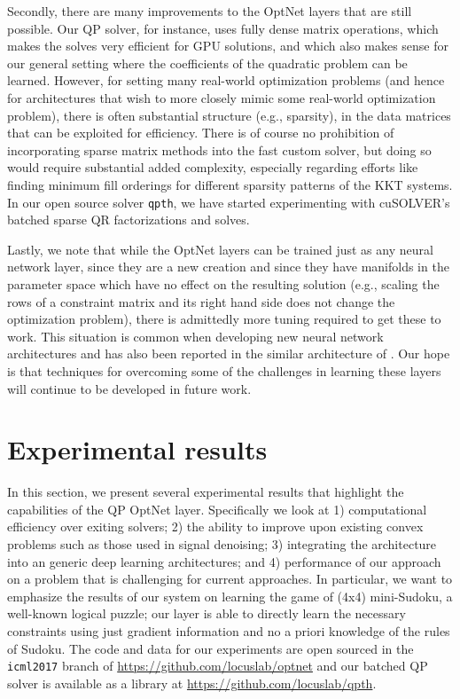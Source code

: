 Secondly, there are many improvements to the OptNet layers that are still
possible.  Our QP solver, for instance, uses fully dense matrix operations,
which makes the solves very efficient for GPU solutions, and which also makes
sense for our general setting where the coefficients of the quadratic problem
can be learned.  However, for setting many real-world optimization problems
(and hence for architectures that wish to more closely mimic some real-world
optimization problem), there is often substantial structure (e.g., sparsity), in
the data matrices that can be exploited for efficiency.
There is of course no prohibition of incorporating sparse matrix methods into
the fast custom solver, but doing so would require substantial added complexity,
especially regarding efforts like finding minimum fill orderings for different
sparsity patterns of the KKT systems.
In our open source solver \verb!qpth!, we have started experimenting
with cuSOLVER's batched sparse QR factorizations and solves.

Lastly, we note that while the OptNet layers can be trained just as any neural
network layer, since they are a new creation and since they have manifolds in
the parameter space which have no effect on the resulting solution (e.g.,
scaling the rows of a constraint matrix and its right hand side does not change
the optimization problem), there is admittedly more tuning required to get these
to work.
This situation is common when developing new neural
network architectures and has also been reported in the
similar architecture of \citet{schmidt2014shrinkage}.
Our hope is that techniques for overcoming some of the challenges
in learning these layers will continue to be developed in future work.

\section{Experimental results}
\label{sec:icnn:exp}

In this section, we present several experimental results that highlight the
capabilities of the QP OptNet layer.
Specifically we look at
1) computational efficiency over exiting solvers;
2) the ability to improve upon existing convex problems such as those used
in signal denoising;
3) integrating the architecture into an generic deep learning architectures;
and 4) performance of our approach on a problem that is challenging for current approaches.
In particular, we want to emphasize the results of our system on learning
the game of (4x4) mini-Sudoku, a well-known logical puzzle;
our layer is able to directly learn the necessary constraints
using just gradient information and no a priori knowledge
of the rules of Sudoku.
The code and data for our experiments are open sourced in the
\verb!icml2017! branch of \url{https://github.com/locuslab/optnet}
and our batched QP solver is available as a library at
\url{https://github.com/locuslab/qpth}.

